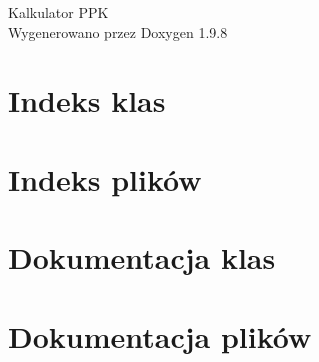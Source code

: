 \documentclass[oneside]{book}
\newcommand{\+}{\discretionary{\mbox{\scriptsize$\hookleftarrow$}}{}{}}
\newcommand{\clearemptydoublepage}{%
    \newpage{\pagestyle{empty}\cleardoublepage}%
  }
\begin{document}
  \raggedbottom
    \hypersetup{pageanchor=false,
                bookmarksnumbered=true,
                pdfencoding=unicode
               }
  \begin{titlepage}
  \vspace*{7cm}
  \begin{center}%
  {\Large Kalkulator PPK}\\
  \vspace*{1cm}
  {\large Wygenerowano przez Doxygen 1.9.8}\\
  \end{center}
  \end{titlepage}
  \clearemptydoublepage
  \tableofcontents
  \clearemptydoublepage
  \hypersetup{pageanchor=true}
\chapter{Indeks klas}

\chapter{Indeks plików}

\chapter{Dokumentacja klas}


\chapter{Dokumentacja plików}










  \backmatter
  \newpage
  \clearemptydoublepage
  \printindex
\end{document}
